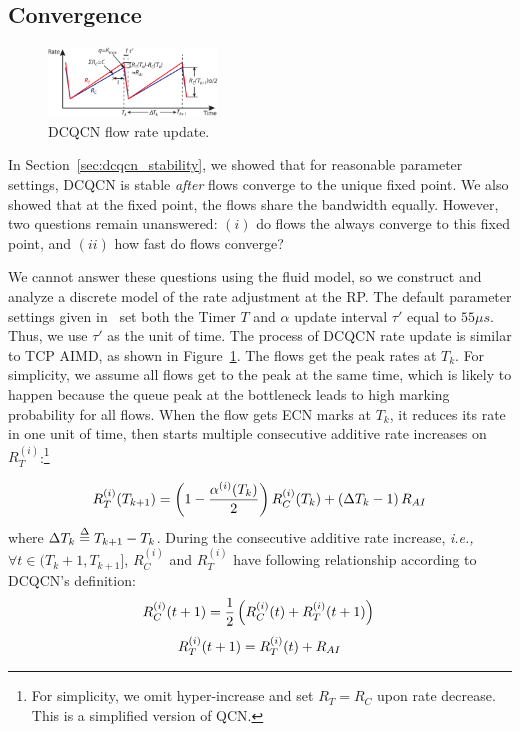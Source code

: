 \subsection{Convergence}
\begin{figure}[t]
\center
\includegraphics[width=0.4\textwidth]{figures/dcqcn_convergence.eps}
\caption{DCQCN flow rate update.}
\label{fig:dcqcn_convergence}
\end{figure}

In Section~\ref{sec:dcqcn_stability}, we showed that for reasonable parameter
settings,  DCQCN is stable {\em after} flows converge to the unique fixed point.
We also showed that at the fixed point, the flows share the bandwidth equally.
However, two questions remain unanswered: $(i)$ do flows the always converge
to this fixed point, and $(ii)$ how fast do flows converge? 

We cannot answer these questions using the fluid model, so we construct and
analyze a discrete model of the rate adjustment at the RP. The default parameter
settings given in~\cite{dcqcn} set both the Timer $T$ and $\alpha$ update
interval $\tau '$ equal to $55\mu s$. Thus, we use $\tau '$ as the unit of time.
The process of DCQCN rate update is similar to TCP AIMD, as shown in
Figure~\ref{fig:dcqcn_convergence}.  The flows get the peak rates at $T_k$. For
simplicity, we assume all flows get to the peak at the same time, which is
likely to happen because the queue peak at the bottleneck leads to high marking
probability for all flows. When the flow gets ECN marks at $T_k$, it reduces its
rate in one unit of time, then starts multiple consecutive additive rate
increases on $R_T^{(i)}$:\footnote{For simplicity, we omit hyper-increase and set 
$R_T = R_C$ upon rate decrease. This is a simplified version of QCN.}

\begin{equation}
\small
R_T^{(i)}({T_{k + 1}}) = \left( {1 - \frac{{{\alpha ^{(i)}}({T_k})}}{2}} \right)R_C^{(i)}({T_k}) + \left( {\Delta {T_k} - 1} \right){R_{AI}}
\label{eq:converge_rc}
\end{equation}
where $\Delta {T_k} \buildrel \Delta \over = {T_{k + 1}} - {T_k}$. During the consecutive 
additive rate increase, {\em i.e.,} $\forall t \in ({T_k} + 1,{T_{k + 1}}]$, $R_C^{(i)}$ and $R_T^{(i)}$ 
have following relationship according to DCQCN's definition:
\begin{equation}
\small
R_C^{(i)}(t + 1) = \frac{1}{2}\left( {R_C^{(i)}(t) + R_T^{(i)}(t + 1)} \right)\\
\label{ref:discrete_rc}
\end{equation}
\begin{equation}
\small
R_T^{(i)}(t + 1) = R_T^{(i)}(t) + {R_{AI}}
\label{ref:discrete_rt}
\end{equation}

